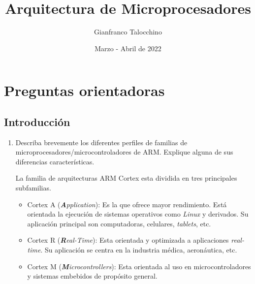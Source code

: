 \documentclass[12pt, a4paper]{article}
\title{Arquitectura de Microprocesadores}
\author{Gianfranco Talocchino}
\date{Marzo - Abril de 2022}
\begin{document}
\maketitle

\section{Preguntas orientadoras}
\subsection{Introducción}
\begin{enumerate}
    \item Describa brevemente los diferentes perfiles de familias de 
    microprocesadores/microcontroladores de ARM. Explique alguna de sus 
    diferencias características.
    
    La familia de arquitecturas ARM Cortex esta dividida en tres 
    principales subfamilias.
    
    \begin{itemize}
        \item Cortex A (\emph{\textbf{A}pplication}): Es la que ofrece mayor rendimiento. Está 
        orientada la ejecución de sistemas operativos como \emph{Linux} y derivados. Su 
        aplicación principal son computadoras, celulares, \emph{tablets}, etc.
        \item Cortex R (\emph{\textbf{R}eal-Time}): Esta orientada y optimizada a aplicaciones 
        \emph{real-time}. Su aplicación se centra en la industria médica, aeronáutica, etc.
        \item Cortex M (\emph{\textbf{M}icrocontrollers}): Esta orientada al uso en 
        microcontroladores y sistemas embebidos de propósito general.
    \end{itemize}
\end{enumerate}
\end{document}
